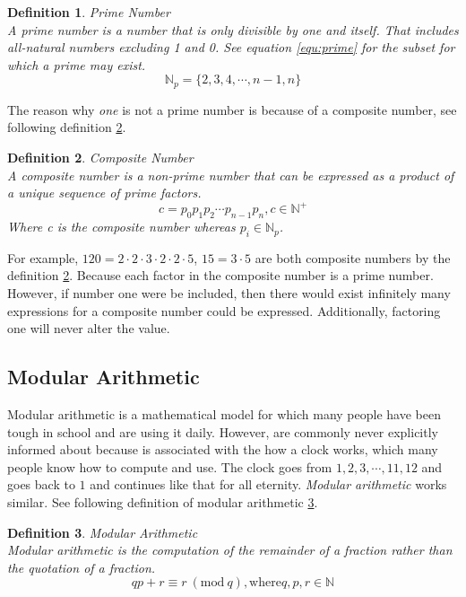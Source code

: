 \documentclass[12pt, oneside, onecolumn]{article}
\newtheorem{definition}{Definition}[section]
\newcommand{\Mod}[1]{\ (\mathrm{mod}\ #1)}
\begin{document}
\begin{definition}{Prime Number}\label{def:prime}
\\
A \emph{prime number} is a number that is only divisible by one and itself. That includes all-natural numbers excluding 1 and 0. See equation \ref{equ:prime} for the subset for which a prime may exist.
\begin{equation}
\mathbb{N}_{p} = \{2,3,4,\cdots,n-1,n\}
\end{equation}\label{equ:prime}
\end{definition}

The reason why \emph{one} is not a prime number is because of a composite number, see following definition \ref{def:comp}.

\begin{definition}{Composite Number}\label{def:comp}
\\
A composite number is a non-prime number that can be expressed as a product of a unique sequence of prime factors.
\begin{equation}
c = p_0 p_1 p_2 \cdots p_{n-1} p_{n}, c \in \mathbb{N}^{+}
\end{equation}
Where c is the composite number whereas $p_{i} \in \mathbb{N}_{p}$.
\end{definition}

For example, $120 = 2 \cdot 2 \cdot 3 \cdot 2 \cdot 2 \cdot 5$, $15 = 3 \cdot 5$ are both composite numbers by the definition \ref{def:comp}. Because each factor in the composite number is a prime number. However, if number one were be included, then there would exist infinitely many expressions for a composite number could be expressed. Additionally, factoring one will never alter the value.

%
\subsection{Modular Arithmetic}\label{sec:mod}
Modular arithmetic is a mathematical model for which many people have been tough in school and are using it daily. However, are commonly never explicitly informed about because is associated with the how a clock works, which many people know how to compute and use. The clock goes from $1,2,3,\cdots,11,12$ and goes back to $1$ and continues like that for all eternity. \textit{Modular arithmetic} works similar. See following definition of modular arithmetic \ref{def:modular}.

\begin{definition}{Modular Arithmetic}\label{def:modular}
\\
Modular arithmetic is the computation of the remainder of a fraction rather than the quotation of a fraction.
\begin{equation}
qp +r \equiv r \Mod{q}, \text{where} q, p, r \in \mathbb{N}
\end{equation}
\end{definition}
\end{document}
